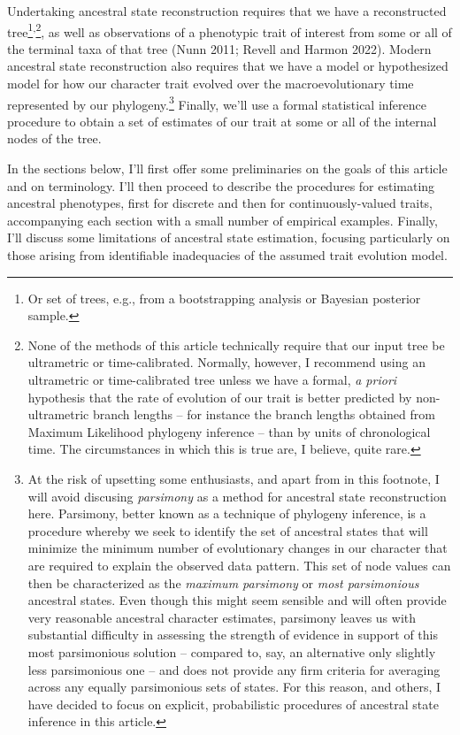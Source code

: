 \documentclass{article}
\begin{document}
Undertaking ancestral state reconstruction requires that we have a reconstructed tree\footnote{Or set of trees, e.g., from a bootstrapping analysis or Bayesian posterior sample.}\textsuperscript{,}\footnote{None of the methods of this article technically require that our input tree be ultrametric or time-calibrated. Normally, however, I recommend using an ultrametric or time-calibrated tree unless we have a formal, \emph{a priori} hypothesis that the rate of evolution of our trait is better predicted by non-ultrametric branch lengths -- for instance the branch lengths obtained from Maximum Likelihood phylogeny inference -- than by units of chronological time. The circumstances in which this is true are, I believe, quite rare.}, as well as observations of a phenotypic trait of interest from some or all of the terminal taxa of that tree (Nunn 2011; Revell and Harmon 2022). Modern ancestral state reconstruction also requires that we have a model or hypothesized model for how our character trait evolved over the macroevolutionary time represented by our phylogeny.\footnote{At the risk of upsetting some enthusiasts, and apart from in this footnote, I will avoid discusing \emph{parsimony} as a method for ancestral state reconstruction here. Parsimony, better known as a technique of phylogeny inference, is a procedure whereby we seek to identify the set of ancestral states that will minimize the minimum number of evolutionary changes in our character that are required to explain the observed data pattern. This set of node values can then be characterized as the \emph{maximum parsimony} or \emph{most parsimonious} ancestral states. Even though this might seem sensible and will often provide very reasonable ancestral character estimates, parsimony leaves us with substantial difficulty in assessing the strength of evidence in support of this most parsimonious solution -- compared to, say, an alternative only slightly less parsimonious one -- and does not provide any firm criteria for averaging across any equally parsimonious sets of states. For this reason, and others, I have decided to focus on explicit, probabilistic procedures of ancestral state inference in this article.} Finally, we'll use a formal statistical inference procedure to obtain a set of estimates of our trait at some or all of the internal nodes of the tree.

In the sections below, I'll first offer some preliminaries on the goals of this article and on terminology. I'll then proceed to describe the procedures for estimating ancestral phenotypes, first for discrete and then for continuously-valued traits, accompanying each section with a small number of empirical examples. Finally, I'll discuss some limitations of ancestral state estimation, focusing particularly on those arising from identifiable inadequacies of the assumed trait evolution model.
\end{document}
